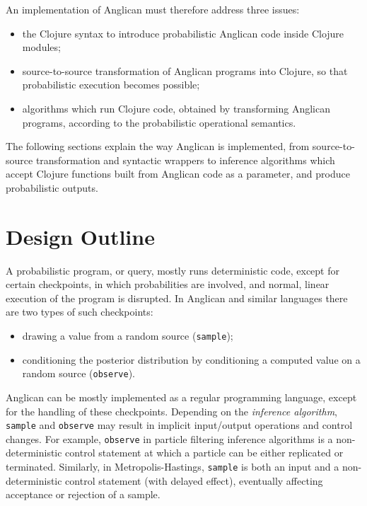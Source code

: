 \documentclass[a4paper]{article}
\begin{document}
An implementation of Anglican must therefore address three issues:
\begin{itemize}
	\item the Clojure syntax to introduce probabilistic Anglican
		code inside Clojure modules;
	\item source-to-source transformation of Anglican programs
		into Clojure, so that probabilistic execution becomes
		possible;
	\item algorithms which run Clojure code, obtained by
		transforming Anglican programs, according to the
		probabilistic operational semantics.
\end{itemize}
The following sections explain the way Anglican is implemented,
from source-to-source transformation and syntactic wrappers to
inference algorithms which accept Clojure functions built from
Anglican code as a parameter, and produce probabilistic outputs.

\section{Design Outline}

A probabilistic program, or query, mostly runs deterministic
code, except for certain checkpoints, in which probabilities are
involved, and normal, linear execution of the program is
disrupted. In Anglican and similar languages there are two
types of such checkpoints:
\begin{itemize}
	\item drawing a value from a random source (\texttt{sample});
	\item conditioning the posterior distribution by
		conditioning a computed value on a random source
		(\texttt{observe}).
\end{itemize}

Anglican can be mostly implemented as a regular programming
language, except for the handling of these checkpoints.
Depending on the \textit{inference algorithm}, \texttt{sample}
and \texttt{observe} may result in implicit input/output
operations and control changes. For example, \texttt{observe} in
particle filtering inference algorithms is a non-deterministic
control statement at which a particle can be either replicated
or terminated. Similarly, in Metropolis-Hastings,
\texttt{sample} is both an input and a non-deterministic control
statement (with delayed effect), eventually affecting acceptance
or rejection of a sample.
\end{document}
